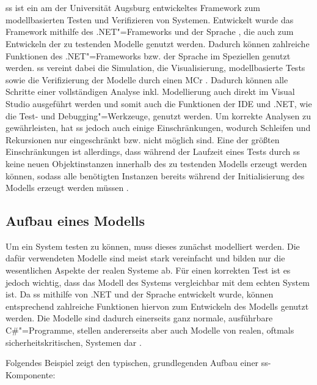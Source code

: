 \section{}
\label{sec:ssharp}

\gls{ss} ist ein am \isse der Universität Augsburg entwickeltes Framework zum modellbasierten Testen und Verifizieren von Systemen.
Entwickelt wurde das Framework mithilfe des .NET"=Frameworks und der Sprache \cS, die auch zum Entwickeln der zu testenden Modelle genutzt werden.
Dadurch können zahlreiche Funktionen des .NET"=Frameworks bzw. der Sprache \cS im Speziellen genutzt werden.
\gls{ss} vereint dabei die Simulation, die Visualisierung, modellbasierte \glspl{Test} sowie die Verifizierung der Modelle durch einen \gls{MCr} \cite{Habermaier2015,Habermaier2016}.
Dadurch können alle Schritte einer vollständigen Analyse inkl. Modellierung auch direkt im Visual Studio ausgeführt werden und somit auch die Funktionen der IDE und .NET, wie \zB die Test- und Debugging"=Werkzeuge, genutzt werden.
Um korrekte Analysen zu gewährleisten, hat \gls{ss} jedoch auch einige Einschränkungen, wodurch \zB Schleifen und Rekursionen nur eingeschränkt bzw. nicht möglich sind.
Eine der größten Einschränkungen ist allerdings, dass während der Laufzeit eines Tests durch \gls{ss} keine neuen Objektinstanzen innerhalb des zu testenden Modells erzeugt werden können, sodass alle benötigten Instanzen bereits während der Initialisierung des Modells erzeugt werden müssen \cite{Habermaier2015}.

\subsection{Aufbau eines Modells}
\label{subsec:ssharpModel}

Um ein System testen zu können, muss dieses zunächst modelliert werden.
Die dafür verwendeten Modelle sind meist stark vereinfacht und bilden nur die wesentlichen Aspekte der realen Systeme ab.
Für einen korrekten Test ist es jedoch wichtig, dass das Modell des Systems vergleichbar mit dem echten System ist.
Da \gls{ss} mithilfe von .NET und der Sprache \cS entwickelt wurde, können entsprechend zahlreiche Funktionen hiervon zum Entwickeln des Modells genutzt werden.
Die Modelle sind dadurch einerseits ganz normale, ausführbare C\#"=Programme, stellen andererseits aber auch Modelle von realen, oftmals sicherheitskritischen, Systemen dar \cite{Habermaier2016}.

Folgendes Beispiel zeigt den typischen, grundlegenden Aufbau einer \gls{ss}-Komponente:


